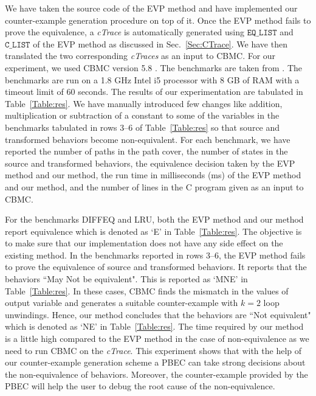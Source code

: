We have taken the source code of the EVP method and have implemented our counter-example
generation procedure on top of it. Once the EVP method fails to prove the
equivalence, a \textit{cTrace} is automatically generated
using $\mathtt{EQ\_LIST}$ and $\mathtt{C\_LIST}$ of the EVP method as discussed
in Sec.~\ref{Sec:CTrace}.  We have then translated the two corresponding
\textit{cTraces} as an input to CBMC. For our experiment, we used CBMC version
5.8 \cite{Clarke04CBMC}. The benchmarks are taken from \cite{Banerjee14}.  The benchmarks are
run on a 1.8 GHz Intel i5 processor with 8 GB of RAM with a timeout limit of 60
seconds. The results of our experimentation are tabulated in Table~\ref{Table:res}. 
We have manually introduced few changes like addition, multiplication
or subtraction of a constant to some of the variables in the benchmarks 
tabulated in rows 3–6 of Table~\ref{Table:res} so that
source and transformed behaviors become non-equivalent.  For each benchmark, we
have reported the number of paths in the path cover, the number of states in the
source and transformed behaviors, the equivalence decision taken by the EVP method and our method,
the run time in milliseconds (ms) of the EVP method and our method, and the number of lines in the C program given as
an input to CBMC.

For the benchmarks DIFFEQ and LRU, both the EVP method and our method report
equivalence which is denoted as `E' in Table~\ref{Table:res}. The objective is to make sure
that our implementation does not have any side effect on the existing method.
In the benchmarks reported in rows 3--6, the EVP method fails to prove the equivalence of
source and transformed behaviors. It reports that the behaviors ``May Not be
equivalent". This is reported as `MNE' in Table~\ref{Table:res}. In these
cases, CBMC finds the mismatch in the values of output variable and generates a suitable
counter-example with $k=2$ loop unwindings.  Hence, our method concludes that the behaviors are ``Not
equivalent" which is denoted as `NE' in Table~\ref{Table:res}. The time required by our
method is a little high compared to the EVP method in the case of non-equivalence as
we need to run CBMC on the \textit{cTrace}. This experiment shows
that with the help of our counter-example generation scheme a PBEC can take
strong decisions about the non-equivalence of behaviors. Moreover, the counter-example
provided by the PBEC will help the user to debug the root cause of the non-equivalence.

